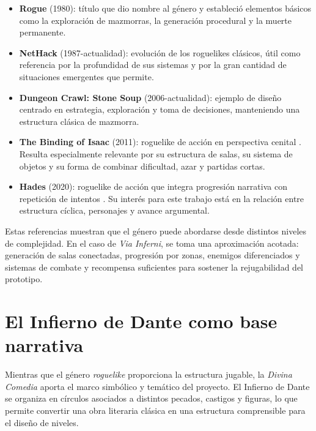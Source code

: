 \begin{itemize}
    \item \textbf{Rogue} (1980): título que dio nombre al género y estableció elementos
    básicos como la exploración de mazmorras, la generación procedural y la muerte
    permanente.
    
    \item \textbf{NetHack} (1987-actualidad): evolución de los roguelikes clásicos, útil
    como referencia por la profundidad de sus sistemas y por la gran cantidad de
    situaciones emergentes que permite.
    
    \item \textbf{Dungeon Crawl: Stone Soup} (2006-actualidad): ejemplo de diseño centrado
    en estrategia, exploración y toma de decisiones, manteniendo una estructura clásica de
    mazmorra.
    
    \item \textbf{The Binding of Isaac} (2011): roguelike de acción en perspectiva cenital
    \cite{bindingIsaacOfficial}. Resulta especialmente relevante por su estructura de
    salas, su sistema de objetos y su forma de combinar dificultad, azar y partidas
    cortas.
    
    \item \textbf{Hades} (2020): roguelike de acción que integra progresión narrativa con
    repetición de intentos \cite{hadesOfficial}. Su interés para este trabajo está en la
    relación entre estructura cíclica, personajes y avance argumental.
\end{itemize}

Estas referencias muestran que el género puede abordarse desde distintos niveles de
complejidad. En el caso de \textit{Via Inferni}, se toma una aproximación acotada:
generación de salas conectadas, progresión por zonas, enemigos diferenciados y sistemas de
combate y recompensa suficientes para sostener la rejugabilidad del prototipo.

\section{El Infierno de Dante como base narrativa}

Mientras que el género \textit{roguelike} proporciona la estructura jugable, la
\textit{Divina Comedia} aporta el marco simbólico y temático del proyecto. El Infierno de
Dante se organiza en círculos asociados a distintos pecados, castigos y figuras, lo que
permite convertir una obra literaria clásica en una estructura comprensible para el diseño
de niveles.

